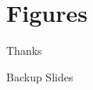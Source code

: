 \documentclass[slidestop,compress,mathserif]{beamer}
\begin{document}

\section{Figures}

\label{lastslide}
\begin{frame}[c]
	\begin{center}
	\Huge Thanks
	\end{center}
\end{frame}

\begin{frame}[c]
	\begin{center}
	\Huge Backup Slides
	\end{center}
\end{frame}
\end{document}
